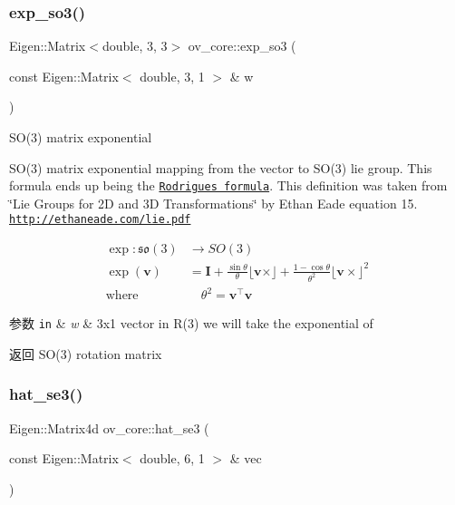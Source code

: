 \subsubsection{\texorpdfstring{exp\+\_\+so3()}{exp\_so3()}}
{\footnotesize\ttfamily Eigen\+::\+Matrix$<$double, 3, 3$>$ ov\+\_\+core\+::exp\+\_\+so3 (\begin{DoxyParamCaption}\item[{const Eigen\+::\+Matrix$<$ double, 3, 1 $>$ \&}]{w }\end{DoxyParamCaption})\hspace{0.3cm}{\ttfamily [inline]}}



S\+O(3) matrix exponential 

S\+O(3) matrix exponential mapping from the vector to S\+O(3) lie group. This formula ends up being the \href{https://en.wikipedia.org/wiki/Rodrigues%27_rotation_formula}{\tt Rodrigues formula}. This definition was taken from \char`\"{}\+Lie Groups for 2\+D and 3\+D Transformations\char`\"{} by Ethan Eade equation 15. \href{http://ethaneade.com/lie.pdf}{\tt http\+://ethaneade.\+com/lie.\+pdf}

\begin{align*} \exp\colon\mathfrak{so}(3)&\to SO(3) \\ \exp(\mathbf{v}) &= \mathbf{I} +\frac{\sin{\theta}}{\theta}\lfloor\mathbf{v}\times\rfloor +\frac{1-\cos{\theta}}{\theta^2}\lfloor\mathbf{v}\times\rfloor^2 \\ \mathrm{where}&\quad \theta^2 = \mathbf{v}^\top\mathbf{v} \end{align*}


\begin{DoxyParams}[1]{参数}
\mbox{\tt in}  & {\em w} & 3x1 vector in R(3) we will take the exponential of \\
\hline
\end{DoxyParams}
\begin{DoxyReturn}{返回}
S\+O(3) rotation matrix 
\end{DoxyReturn}
\mbox{\label{namespaceov__core_a2854f4368bab599be2404f396f5ee434}} 
\subsubsection{\texorpdfstring{hat\+\_\+se3()}{hat\_se3()}}
{\footnotesize\ttfamily Eigen\+::\+Matrix4d ov\+\_\+core\+::hat\+\_\+se3 (\begin{DoxyParamCaption}\item[{const Eigen\+::\+Matrix$<$ double, 6, 1 $>$ \&}]{vec }\end{DoxyParamCaption})\hspace{0.3cm}{\ttfamily [inline]}}



